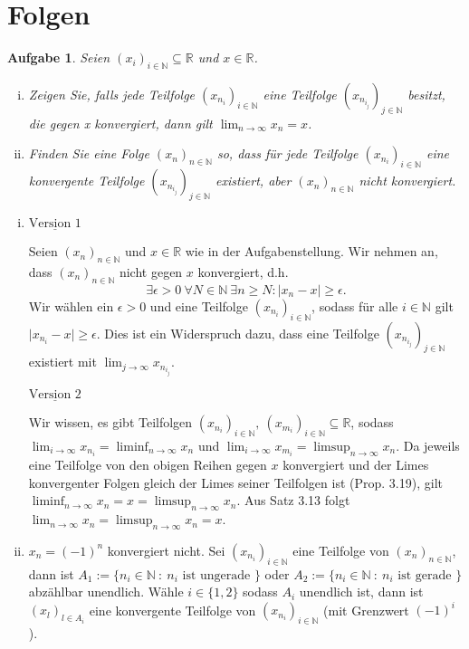 \documentclass[a4paper, 20]{exam}
\newtheorem{ex}{Aufgabe}
\newcommand\RR{\mathbb{R}}
\newcommand\NN{\mathbb{N}}
\begin{document}
\newpage


\section{Folgen}
\begin{ex}
Seien $(x_i)_{i\in \NN} \subseteq \RR$ und $x\in \RR$.
\begin{enumerate}[i.)]
\item
Zeigen Sie, falls jede Teilfolge $(x_{n_i})_{i\in \NN}$ eine Teilfolge $(x_{n_{i_j}})_{j\in \NN}$ besitzt, die gegen x konvergiert, dann gilt $\lim_{n \rightarrow \infty} x_n= x$.
\item
Finden Sie eine Folge $(x_n)_{n\in \NN}$ so, dass f\"ur jede Teilfolge 
$( x_{n_i})_{i \in \NN}$ eine konvergente Teilfolge $ (x_{n_{i_j}})_{j\in \NN}$ 
existiert, aber $(x_n)_{n \in \NN}$ nicht konvergiert.
\end{enumerate}
\end{ex}
\begin{solution}
\begin{enumerate}[i.)]
\item
$\underline{\text{Version } 1}$

Seien $(x_n)_{n\in \NN}$ und $x\in \RR$ wie in der Aufgabenstellung. Wir nehmen an, dass $(x_n)_{n\in \NN}$ nicht gegen $x$ konvergiert, d.h.
$$ \exists \epsilon >0 \ \forall N\in \NN \ \exists n\geq N : \vert x_n - x \vert \geq \epsilon. $$
Wir w\"ahlen ein $\epsilon >0$ und eine Teilfolge $(x_{n_i})_{i\in \NN}$, sodass f\"ur alle $i\in \NN$ gilt $\vert x_{n_i} -x \vert \geq \epsilon$. Dies ist ein Widerspruch dazu, dass eine Teilfolge $(x_{n_{i_j}})_{j\in \NN}$ existiert mit $\lim_{j \rightarrow \infty} x_{n_{i_j}}$.

$\underline{\text{Version } 2}$

Wir wissen, es gibt Teilfolgen $(x_{n_i})_{i \in \NN}, \ (x_{m_i})_{i \in \NN} \subseteq \RR$, sodass $\lim_{i \rightarrow \infty} x_{n_i}= \liminf_{n \rightarrow \infty} x_n$ und $\lim_{i \rightarrow \infty} x_{m_i}= \limsup_{n \rightarrow \infty} x_n$. Da jeweils eine Teilfolge von den obigen Reihen gegen $x$ konvergiert und der Limes konvergenter Folgen gleich der Limes seiner Teilfolgen ist (Prop. 3.19), gilt $\liminf_{n \rightarrow \infty} x_n = x = \limsup_{n \rightarrow \infty} x_n$. Aus Satz 3.13 folgt $\lim_{n \rightarrow \infty} x_n = \limsup_{n \rightarrow \infty} x_n =x$.
\item
$x_n=(-1)^n$ konvergiert nicht. Sei $(x_{n_i})_{i\in \NN}$ eine Teilfolge von $(x_n)_{n\in \NN}$, dann ist
$A_1:=\{n_i\in \NN \ : \ n_i \text{ ist ungerade } \}$ oder $A_2:=\{n_i\in \NN \ : \ n_i \text{ ist gerade } \}$ abz\"ahlbar unendlich. W\"ahle $i\in \{1,2 \}$ sodass $A_i$ unendlich ist, dann ist $(x_l)_{l\in A_i}$ eine konvergente Teilfolge von $(x_{n_i})_{i\in \NN}$ (mit Grenzwert $(-1)^i$).
\end{enumerate}
\end{solution}
\end{document}
